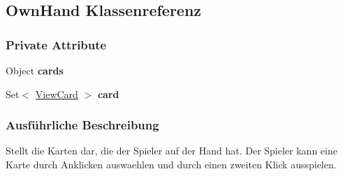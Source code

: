 \hypertarget{a00019}{\subsection{Own\-Hand Klassenreferenz}
\label{a00019}
}
\subsubsection*{Private Attribute}
\begin{DoxyCompactItemize}
\item 
\hypertarget{a00019_a9233afadd1e46e11f03ea518e9c86366}{Object {\bfseries cards}}\label{a00019_a9233afadd1e46e11f03ea518e9c86366}

\item 
\hypertarget{a00019_a32963d9bbf9a4ad1ca8d0e1cf6c54bfe}{Set$<$ \hyperlink{a00022}{View\-Card} $>$ {\bfseries card}}\label{a00019_a32963d9bbf9a4ad1ca8d0e1cf6c54bfe}

\end{DoxyCompactItemize}


\subsubsection{Ausführliche Beschreibung}
Stellt die Karten dar, die der Spieler auf der Hand hat. Der Spieler kann eine Karte durch Anklicken auswaehlen und durch einen zweiten Klick ausspielen. 